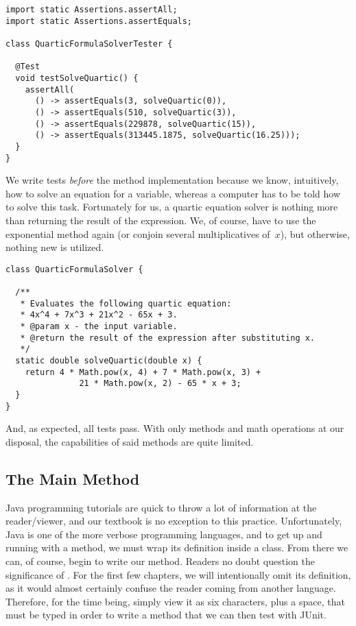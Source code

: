 \begin{lstlisting}[language=MyJava]
import static Assertions.assertAll;
import static Assertions.assertEquals;

class QuarticFormulaSolverTester {

  @Test
  void testSolveQuartic() {
    assertAll(
      () -> assertEquals(3, solveQuartic(0)),
      () -> assertEquals(510, solveQuartic(3)),
      () -> assertEquals(229878, solveQuartic(15)),
      () -> assertEquals(313445.1875, solveQuartic(16.25)));
  }
}
\end{lstlisting}

We write tests \emph{before} the method implementation because we know, intuitively, how to solve an equation for a variable, whereas a computer has to be told how to solve this task. 
Fortunately for us, a quartic equation solver is nothing more than returning the result of the expression. 
We, of course, have to use the exponential  method again (or conjoin several multiplicatives of~$x$), but otherwise, nothing new is utilized.

\begin{lstlisting}[language=MyJava]
class QuarticFormulaSolver {

  /**
   * Evaluates the following quartic equation:
   * 4x^4 + 7x^3 + 21x^2 - 65x + 3.
   * @param x - the input variable.
   * @return the result of the expression after substituting x.
   */
  static double solveQuartic(double x) {
    return 4 * Math.pow(x, 4) + 7 * Math.pow(x, 3) + 
               21 * Math.pow(x, 2) - 65 * x + 3;
  }
}
\end{lstlisting}

And, as expected, all tests pass. 
With only methods and math operations at our disposal, the capabilities of said methods are quite limited. 

\subsection{The Main Method}
Java programming tutorials are quick to throw a lot of information at the reader/viewer, and our textbook is no exception to this practice. Unfortunately, Java is one of the more verbose programming languages, and to get up and running with a method, we must wrap its definition inside a class. From there we can, of course, begin to write our  method. Readers no doubt question the significance of . For the first few chapters, we will intentionally omit its definition, as it would almost certainly confuse the reader coming from another language. Therefore, for the time being, simply view it as six characters, plus a space, that must be typed in order to write a method that we can then test with JUnit. 

